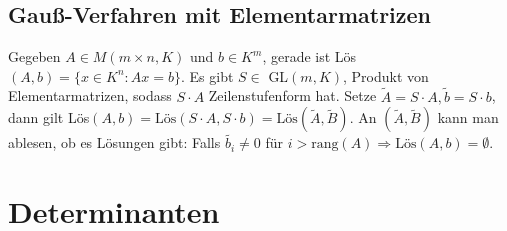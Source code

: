 \documentclass[12pt,a4paper]{article}
\theoremstyle{plain}
\numberwithin{equation}{section}
\begin{document}
\subsection{Gauß-Verfahren mit Elementarmatrizen}
Gegeben $A\in M(m\times n,K)$ und $b\in K^m$, gerade ist Lös$(A,b)=\{x\in K^n:Ax=b\}$. Es gibt $S\in $ GL$(m,K)$, Produkt von Elementarmatrizen, sodass $S\cdot A$ Zeilenstufenform hat. Setze $\tilde{A}=S\cdot A, \tilde{b}=S\cdot b$, dann gilt Lös$(A,b)=\text{Lös}(S\cdot A, S\cdot b)=\text{Lös}(\tilde{A},\tilde{B})$. An $(\tilde{A},\tilde{B})$ kann man ablesen, ob es Lösungen gibt: Falls $\tilde{b_i}\neq 0$ für $i>\text{rang}(A) \Rightarrow \text{Lös}(A,b)=\emptyset$.
\section{Determinanten}
\end{document}
